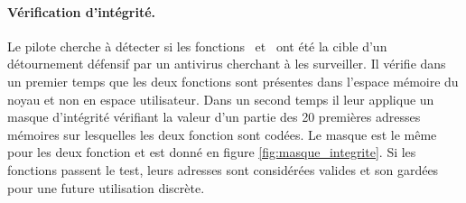 \paragraph{Vérification d'intégrité.}
Le pilote cherche à détecter si les fonctions \ZwA\ et \ZwP\ ont été la cible d'un détournement défensif par un antivirus cherchant à les surveiller.
Il vérifie dans un premier temps que les deux fonctions sont présentes dans l'espace mémoire du noyau et non en espace utilisateur.
Dans un second temps il leur applique un masque d'intégrité vérifiant la valeur d'un partie des 20 premières adresses mémoires sur lesquelles les deux fonction sont codées. Le masque est le même pour les deux fonction et est donné en figure \ref{fig:masque_integrite}.
Si les fonctions passent le test, leurs adresses sont considérées valides et son gardées pour une future utilisation discrète.


